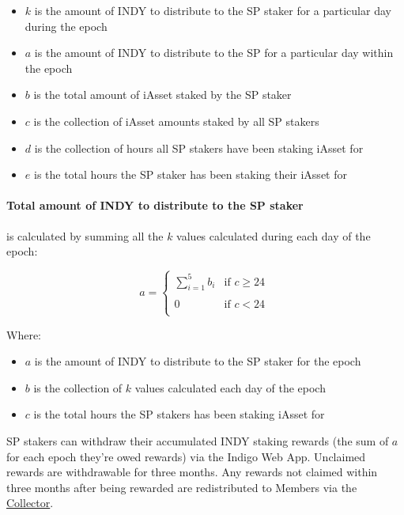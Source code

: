 \documentclass{article}
\begin{document}
\begin{sloppypar}
\begin{itemize}
\item
  \(k\) is the amount of INDY to distribute to the SP staker for a
  particular day during the epoch
\item
  \(a\) is the amount of INDY to distribute to the SP for a particular
  day within the epoch
\item
  \(b\) is the total amount of iAsset staked by the SP staker
\item
  \(c\) is the collection of iAsset amounts staked by all SP stakers
\item
  \(d\) is the collection of hours all SP stakers have been staking
  iAsset for
\item
  \(e\) is the total hours the SP staker has been staking their iAsset
  for
\end{itemize}

\hypertarget{total-amount-of-indy-to-distribute-to-the-sp-staker}{%
\paragraph{Total amount of INDY to distribute to the SP
staker}\label{total-amount-of-indy-to-distribute-to-the-sp-staker}}

is calculated by summing all the \(k\) values calculated during each day
of the epoch:

\[a = \left\{ \begin{matrix}
  \sum_{i = 1}^{5}b_{i} & \text{if\ }c \geq 24 \\ \\
  0 & \text{if\ }c < 24 \\
  \end{matrix} \right.\ \]

Where:

\begin{itemize}
\item
  \(a\) is the amount of INDY to distribute to the SP staker for the
  epoch
\item
  \(b\) is the collection of \(k\) values calculated each day of the
  epoch
\item
  \(c\) is the total hours the SP stakers has been staking iAsset for
\end{itemize}

SP stakers can withdraw their accumulated INDY staking rewards (the sum
of \(a\) for each epoch they're owed rewards) via the Indigo Web App.
Unclaimed rewards are withdrawable for three months. Any rewards not
claimed within three months after being rewarded are redistributed to
Members via the \protect\hyperlink{protocol-profit-sharing}{Collector}.


\end{sloppypar}
\end{document}
